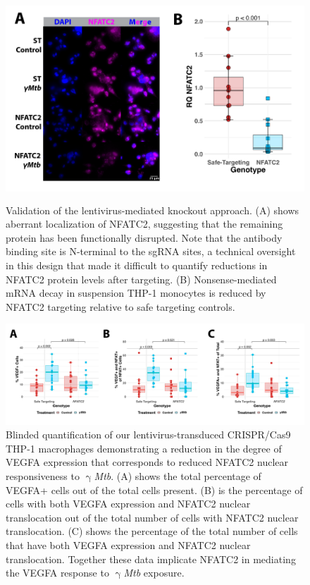 \begin{figure}
\centering
\includegraphics[height=3in]{images/lentivalid.pdf}
\caption[Validation of \textit{NFATC2} knockout cells]{Validation of the lentivirus\hyp{}mediated knockout approach. (A) shows aberrant localization of NFATC2, suggesting that the remaining protein has been functionally disrupted. Note that the antibody binding site is N\hyp{}terminal to the sgRNA sites, a technical oversight in this design that made it difficult to quantify reductions in NFATC2 protein levels after targeting. (B) Nonsense\hyp{}mediated mRNA decay in suspension THP\hyp{}1 monocytes is reduced by NFATC2 targeting relative to safe targeting controls.}
\label{figure:validation}
\end{figure}

\begin{figure}
\centering
\includegraphics[width=\textwidth]{images/lentiIFquant.pdf}
\caption[Quantitation of \textit{NFATC2} knockout THP\hyp{}1 macrophages]{Blinded quantification of our lentivirus\hyp{}transduced CRISPR/Cas9 THP\hyp{}1 macrophages demonstrating a reduction in the degree of VEGFA expression that corresponds to reduced NFATC2 nuclear responsiveness to $\upgamma$\textit{Mtb}. (A) shows the total percentage of VEGFA+ cells out of the total cells present. (B) is the percentage of cells with both VEGFA expression and NFATC2 nuclear translocation out of the total number of cells with NFATC2 nuclear translocation. (C) shows the percentage of the total number of cells that have both VEGFA expression and NFATC2 nuclear translocation. Together these data implicate NFATC2 in mediating the VEGFA response to $\upgamma$\textit{Mtb} exposure.}
\label{figure:lentiIFquant}
\end{figure}

